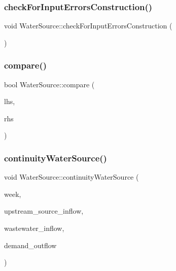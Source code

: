 \subsubsection{\texorpdfstring{check\+For\+Input\+Errors\+Construction()}{checkForInputErrorsConstruction()}}
{\footnotesize\ttfamily void Water\+Source\+::check\+For\+Input\+Errors\+Construction (\begin{DoxyParamCaption}{ }\end{DoxyParamCaption})}

\mbox{\label{classWaterSource_a7a1325107c74bb0ea553dc3547204e01_a7a1325107c74bb0ea553dc3547204e01}} 
\subsubsection{\texorpdfstring{compare()}{compare()}}
{\footnotesize\ttfamily bool Water\+Source\+::compare (\begin{DoxyParamCaption}\item[{\mbox{\hyperlink{classWaterSource}{Water\+Source}} $\ast$}]{lhs,  }\item[{\mbox{\hyperlink{classWaterSource}{Water\+Source}} $\ast$}]{rhs }\end{DoxyParamCaption})\hspace{0.3cm}{\ttfamily [static]}}

\mbox{\label{classWaterSource_a1137cd86f8d3f8a48ebec54282132993_a1137cd86f8d3f8a48ebec54282132993}} 
\subsubsection{\texorpdfstring{continuity\+Water\+Source()}{continuityWaterSource()}}
{\footnotesize\ttfamily void Water\+Source\+::continuity\+Water\+Source (\begin{DoxyParamCaption}\item[{int}]{week,  }\item[{double}]{upstream\+\_\+source\+\_\+inflow,  }\item[{double}]{wastewater\+\_\+inflow,  }\item[{vector$<$ double $>$ \&}]{demand\+\_\+outflow }\end{DoxyParamCaption})}

